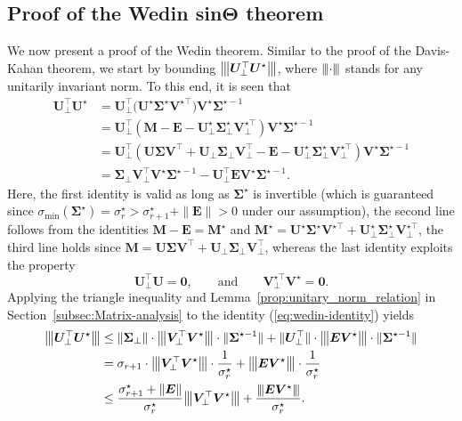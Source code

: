 %
\subsection{Proof of the Wedin \texorpdfstring{sin$\bm{\Theta}$}{TEXT} theorem}
We now present a proof of the Wedin theorem.
Similar to the proof of the Davis-Kahan theorem, we start by bounding ${\big\vert\kern-0.25ex\big\vert\kern-0.25ex\big\vert \bm{U}_{\perp}^{\top}\bm{U}^{\star} \big\vert\kern-0.25ex\big\vert\kern-0.25ex\big\vert}$,
where ${\left\vert\kern-0.25ex\left\vert\kern-0.25ex\left\vert \cdot \right\vert\kern-0.25ex\right\vert\kern-0.25ex\right\vert}$ stands for any unitarily invariant
norm. To this end, it is seen that
%
\begin{align}
\bm{U}_{\perp}^{\top}\bm{U}^{\star}
	& =\bm{U}_{\perp}^{\top}\big(\bm{U}^{\star}\bm{\Sigma}^{\star}\bm{V}^{\star\top}\big)\bm{V}^{\star}\bm{\Sigma}^{\star-1}\nonumber \\
	& =\bm{U}_{\perp}^{\top}\left(\bm{M}-\bm{E}-\bm{U}_{\perp}^{\star}\bm{\Sigma}_{\perp}^{\star}\bm{V}_{\perp}^{\star\top}\right)\bm{V}^{\star}\bm{\Sigma}^{\star-1}\nonumber \\
 & =\bm{U}_{\perp}^{\top}\left(\bm{U}\bm{\Sigma}\bm{V}^{\top}+\bm{U}_{\perp}\bm{\Sigma}_{\perp}\bm{V}_{\perp}^{\top}-\bm{E}-\bm{U}_{\perp}^{\star}\bm{\Sigma}_{\perp}^{\star}\bm{V}_{\perp}^{\star\top}\right)\bm{V}^{\star}\bm{\Sigma}^{\star-1}\nonumber \\
 & =\bm{\Sigma}_{\perp}\bm{V}_{\perp}^{\top}\bm{V}^{\star}\bm{\Sigma}^{\star-1}-\bm{U}_{\perp}^{\top}\bm{E}\bm{V}^{\star}\bm{\Sigma}^{\star-1} .
	\label{eq:wedin-identity}
\end{align}
%
Here, the first identity is valid as long as $\bm{\Sigma}^{\star}$ is invertible (which is guaranteed since $\sigma_{\min}(\bm{\Sigma}^{\star})=\sigma_r^{\star} > \sigma_{r+1}^{\star}+ \|\bm{E}\|>0$ under our assumption),
the second line follows from the identities $\bm{M}-\bm{E}=\bm{M}^{\star}$ and $\bm{M}^{\star}=\bm{U}^{\star}\bm{\Sigma}^{\star}\bm{V}^{\star\top}+\bm{U}_{\perp}^{\star}\bm{\Sigma}_{\perp}^{\star}\bm{V}_{\perp}^{\star\top}$, the third line holds since $\bm{M}=\bm{U}\bm{\Sigma}\bm{V}^{\top}+\bm{U}_{\perp}\bm{\Sigma}_{\perp}\bm{V}_{\perp}^{\top}$,
whereas the last identity exploits the property
%
\[
\bm{U}_{\perp}^{\top}\bm{U}=\bm{0},\qquad \text{and}\qquad \bm{V}_{\perp}^{\star\top}\bm{V}^{\star}=\bm{0}.
\]
%
Applying the triangle inequality and Lemma~\ref{prop:unitary_norm_relation} in Section~\ref{subsec:Matrix-analysis} to the identity (\ref{eq:wedin-identity})
yields
%
\begin{align}
\vertiiibig{\bm{U}_{\perp}^{\top}\bm{U}^{\star}}
	& \leq \|\bm{\Sigma}_{\perp}\| \cdot \vertiiibig{\bm{V}_{\perp}^{\top}\bm{V}^{\star}} \cdot \|\bm{\Sigma}^{\star-1}\|
	 +  \| \bm{U}_{\perp}^{\top}\|\cdot \vertiiibig{\bm{E}\bm{V}^{\star}} \cdot \|\bm{\Sigma}^{\star-1}\| \notag\\
	 & =  \sigma_{r+1} \cdot \vertiiibig{\bm{V}_{\perp}^{\top}\bm{V}^{\star}} \cdot \frac{1}{\sigma_r^{\star}}
	 + \vertiiibig{\bm{E}\bm{V}^{\star}} \cdot \frac{1}{\sigma_r^{\star}}
	   \notag\\
 & \leq\frac{\sigma_{r+1}^{\star}+\|\bm{E}\|}{\sigma_{r}^{\star}}\vertiiibig{\bm{V}_{\perp}^{\top}\bm{V}^{\star}}+\frac{\vertiii{\bm{E}\bm{V}^{\star}}}{\sigma_{r}^{\star}}.
	\label{eq:Uperp-Ustar-UB}
\end{align}
